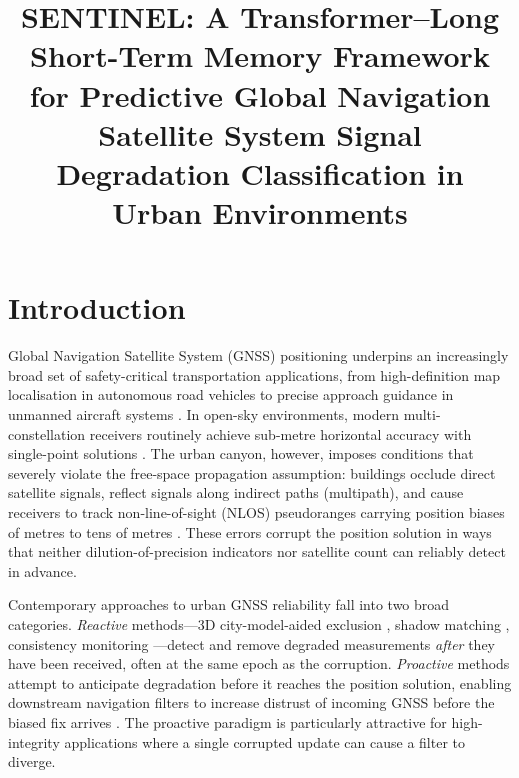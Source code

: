 \documentclass[pdflatex,sn-mathphys-num]{sn-jnl}
\title[SENTINEL: Predictive GNSS Degradation Classification]{%
  SENTINEL: A Transformer--Long Short-Term Memory Framework for Predictive
  Global Navigation Satellite System Signal Degradation Classification
  in Urban Environments}
\author*[1]{\fnm{First} \sur{Author}}\email{author1@buaa.edu.cn}
\author[1]{\fnm{Second} \sur{Author}}
\author[1]{\fnm{Third} \sur{Author}}
\affil*[1]{%
  \orgdiv{School of Electronics and Information Engineering},
  \orgname{Beihang University},
  \orgaddress{\city{Hangzhou}, \postcode{100191}, \country{China}}}
\begin{document}
\maketitle

\section{Introduction}\label{sec:intro}

Global Navigation Satellite System (GNSS) positioning underpins an
increasingly broad set of safety-critical transportation applications, from
high-definition map localisation in autonomous road vehicles
\cite{[AuthorYear_AV_GNSS_survey]} to precise approach guidance in
unmanned aircraft systems \cite{[AuthorYear_UAS_GNSS]}.  In open-sky
environments, modern multi-constellation receivers routinely achieve
sub-metre horizontal accuracy with single-point solutions
\cite{[AuthorYear_GNSS_handbook]}.  The urban canyon, however, imposes
conditions that severely violate the free-space propagation assumption:
buildings occlude direct satellite signals, reflect signals along indirect
paths (multipath), and cause receivers to track non-line-of-sight (NLOS)
pseudoranges carrying position biases of metres to tens of metres
\cite{[AuthorYear_NLOS_multipath_survey]}.  These errors corrupt the
position solution in ways that neither dilution-of-precision indicators nor
satellite count can reliably detect in advance.

Contemporary approaches to urban GNSS reliability fall into two broad
categories.  \textit{Reactive} methods---3D city-model-aided exclusion
\cite{[AuthorYear_3D_city_model]}, shadow matching
\cite{[AuthorYear_shadow_matching]}, consistency monitoring
\cite{[AuthorYear_RAIM_classic]}---detect and remove degraded measurements
\textit{after} they have been received, often at the same epoch as the
corruption.  \textit{Proactive} methods attempt to anticipate degradation
before it reaches the position solution, enabling downstream navigation
filters to increase distrust of incoming GNSS before the biased fix arrives
\cite{[AuthorYear_proactive_GNSS]}.  The proactive paradigm is particularly
attractive for high-integrity applications where a single corrupted update
can cause a filter to diverge.
\end{document}
